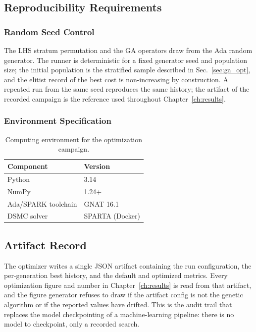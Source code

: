 \subsection{Reproducibility Requirements}

\subsubsection*{Random Seed Control}
The LHS stratum permutation and the GA operators draw from the Ada random generator. The runner is deterministic for a fixed generator seed and population size; the initial population is the stratified sample described in Sec.~\ref{sec:ga_opt}, and the elitist record of the best cost is non-increasing by construction. A repeated run from the same seed reproduces the same history; the artifact of the recorded campaign is the reference used throughout Chapter~\ref{ch:results}.

\subsubsection*{Environment Specification}
\begin{table}[H]
    \centering
    \caption{Computing environment for the optimization campaign.}
    \label{tab:env_spec}
    \begin{tabular}{|l|l|}
        \hline
        \textbf{Component} & \textbf{Version} \\ \hline
        Python & 3.14 \\ \hline
        NumPy & 1.24+ \\ \hline
        Ada/SPARK toolchain & GNAT 16.1 \\ \hline
        DSMC solver & SPARTA (Docker) \\ \hline
    \end{tabular}
\end{table}

\subsection{Artifact Record}
The optimizer writes a single JSON artifact containing the run configuration, the per-generation best history, and the default and optimized metrics. Every optimization figure and number in Chapter~\ref{ch:results} is read from that artifact, and the figure generator refuses to draw if the artifact config is not the genetic algorithm or if the reported values have drifted. This is the audit trail that replaces the model checkpointing of a machine-learning pipeline: there is no model to checkpoint, only a recorded search.

\clearpage
